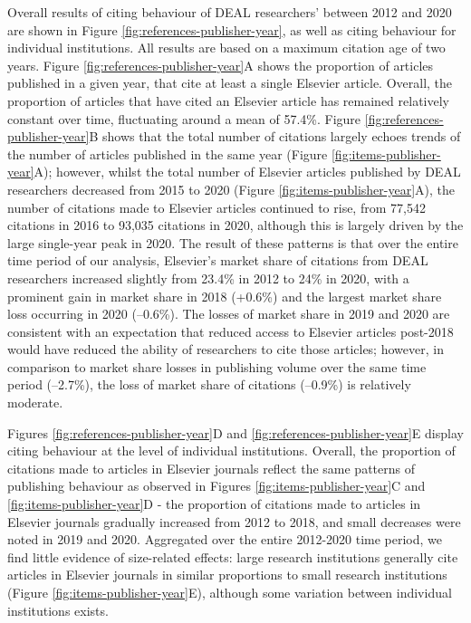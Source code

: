 \documentclass[
]{article}
\begin{document}
Overall results of citing behaviour of DEAL researchers' between 2012 and 2020 are shown in Figure \ref{fig:references-publisher-year}, as well as citing behaviour for individual institutions. All results are based on a maximum citation age of two years. Figure \ref{fig:references-publisher-year}A shows the proportion of articles published in a given year, that cite at least a single Elsevier article. Overall, the proportion of articles that have cited an Elsevier article has remained relatively constant over time, fluctuating around a mean of 57.4\%. Figure \ref{fig:references-publisher-year}B shows that the total number of citations largely echoes trends of the number of articles published in the same year (Figure \ref{fig:items-publisher-year}A); however, whilst the total number of Elsevier articles published by DEAL researchers decreased from 2015 to 2020 (Figure \ref{fig:items-publisher-year}A), the number of citations made to Elsevier articles continued to rise, from 77,542 citations in 2016 to 93,035 citations in 2020, although this is largely driven by the large single-year peak in 2020. The result of these patterns is that over the entire time period of our analysis, Elsevier's market share of citations from DEAL researchers increased slightly from 23.4\% in 2012 to 24\% in 2020, with a prominent gain in market share in 2018 (+0.6\%) and the largest market share loss occurring in 2020 (--0.6\%). The losses of market share in 2019 and 2020 are consistent with an expectation that reduced access to Elsevier articles post-2018 would have reduced the ability of researchers to cite those articles; however, in comparison to market share losses in publishing volume over the same time period (--2.7\%), the loss of market share of citations (--0.9\%) is relatively moderate.

Figures \ref{fig:references-publisher-year}D and \ref{fig:references-publisher-year}E display citing behaviour at the level of individual institutions. Overall, the proportion of citations made to articles in Elsevier journals reflect the same patterns of publishing behaviour as observed in Figures \ref{fig:items-publisher-year}C and \ref{fig:items-publisher-year}D - the proportion of citations made to articles in Elsevier journals gradually increased from 2012 to 2018, and small decreases were noted in 2019 and 2020. Aggregated over the entire 2012-2020 time period, we find little evidence of size-related effects: large research institutions generally cite articles in Elsevier journals in similar proportions to small research institutions (Figure \ref{fig:items-publisher-year}E), although some variation between individual institutions exists.
\end{document}
